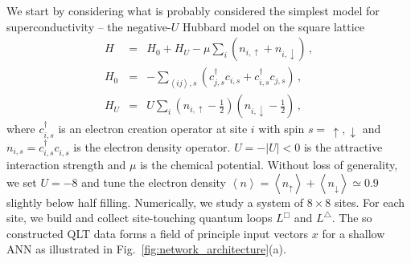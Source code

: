 \documentclass[amsmath,amssymb, aps, prx, longbibliography, twocolumn]{revtex4-1}
\begin{document}
We start by considering what is probably considered the simplest model for superconductivity -- the negative-$U$ Hubbard model on the square lattice \cite{Scalettar1989, Scalapino1992}
\begin{eqnarray}
H &=& H_0 + H_U -  \mu\underset{i}{\sum} \left(n_{i,\uparrow} +n_{i,\downarrow}\right) \,, \nonumber\\
H_0 &=& -\underset{\left\langle ij \right\rangle, s}{\sum} \left( c^\dagger_{j,s}c_{i,s} +  c^\dagger_{i,s}c_{j,s} \right) \,, \nonumber \\
H_U &=& U \underset{i}{\sum} \left(n_{i,\uparrow}-\frac{1}{2}\right) \left(n_{i,\downarrow}-\frac{1}{2}\right) \,,
\label{eq:hubbard}
\end{eqnarray}
where $c^\dagger_{i,s}$ is an electron creation operator at site $i$ with spin $s =\, \uparrow, \downarrow$  and $n_{i,s}=c^\dagger_{i,s}c^{\phantom\dagger}_{i,s}$ is the electron density operator. $U=-\left|U\right|<0$ is the attractive interaction strength and $\mu$ is the chemical potential.  Without loss of generality, we set $U=-8$ and tune the electron density $\left\langle n\right\rangle = \left\langle n_\uparrow\right\rangle+ \left\langle n_\downarrow\right\rangle  \simeq 0.9$ slightly below half filling. 
Numerically, we study a system of $8\times 8$ sites. For each site, we  build and collect site-touching quantum loops $L^\Box$ and $ L^\triangle$. The so constructed QLT data forms a field of principle input vectors $x$ for a shallow ANN as illustrated in Fig.~\ref{fig:network_architecture}(a). 
\end{document}
